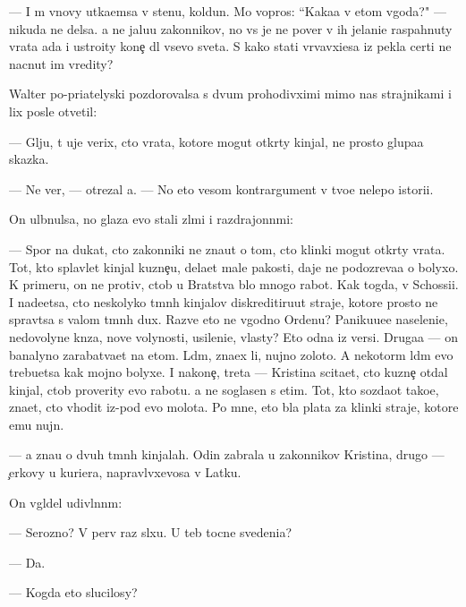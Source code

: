 \documentclass[10pt]{book}
\begin{document}
— I m{\yi} vnovy ut{\yi}ka{\y}emsa v stenu, koldun. Mo{\y} vopros: ``Kaka{\y}a v etom v{\yi}\-go\-da?" — nikuda ne delsa. {\Y}a ne jalu{\y}u zakonnikov, no vs{\e} je ne pover{\io} v ih jelani{\y}e raspahnuty vra\-ta ada i ustro{\y}ity kone{\c} dl{\ia} vsevo sveta. S kako{\y} stati v{\yi}rvavxi{\y}esa iz pekla certi ne nacnut im vredity?

Walter po-pri{\y}atelyski pozdorovalsa s dvum{\ia} prohodivximi mimo nas strajnikami i lix posle otvetil:

— Gl{\ia}ju, t{\yi} uje verix, cto vra\-ta, ko\-to\-r{\yi}\-{\y}e mogut otkr{\yi}ty kinjal{\yi}, ne prosto glupa{\y}a skazka.

— Ne ver{\io}, — otrezal {\y}a. — No eto vesom{\yi}{\y} kontrargument v tvo{\y}e{\y} nelepo{\y} istori{\y}i.

On ul{\yi}bnulsa, no glaza {\y}evo stali zl{\yi}mi i razdrajonn{\yi}mi:

— Spor{\io} na dukat, cto zakonniki ne zna{\y}ut o tom, cto klinki mogut otkr{\yi}ty vra\-ta. Tot, kto splavl{\ia}{\y}et kinjal{\yi} kuzne{\c}u, dela{\y}et mal{\yi}{\y}e pakosti, daje ne podozreva{\y}a o bolyxo{\y}. K primeru, on ne protiv, ctob{\yi} u Bratstva b{\yi}lo mnogo rabot{\yi}. Kak togda, v Schossi{\y}i. I nade{\y}etsa, cto neskolyko t{\e}mn{\yi}h kinjalov diskreditiru{\y}ut straje{\y}, ko\-to\-r{\yi}\-{\y}e prosto ne sprav{\ia}tsa s valom t{\e}mn{\yi}h dux. Razve eto ne v{\yi}godno Ordenu? Paniku{\y}u{\x}e{\y}e naseleni{\y}e, nedovolyn{\yi}{\y}e kn{\ia}z{\y}a, nov{\yi}{\y}e volynosti, usileni{\y}e, vlas\-ty? Eto odna iz versi{\y}. Druga{\y}a — on banalyno zarabat{\yi}va{\y}et na etom. L{\io}d{\ia}m, zna\-{\y}ex li, nujno zoloto. A nekotor{\yi}m l{\io}d{\ia}m {\y}evo trebu{\y}etsa kak mojno bolyxe. I na\-ko\-ne{\c}, tret{\y}a — Kristina sci\-ta\-{\y}et, cto kuzne{\c} otdal kinjal, ctob{\yi} proverity {\y}evo rabotu. {\Y}a ne soglasen s etim. Tot, kto sozda{\y}ot tako{\y}e, zna{\y}et, cto v{\yi}hodit iz-pod {\y}evo molota. Po mne, eto b{\yi}la plata za klinki straje{\y}, ko\-to\-r{\yi}\-{\y}e {\y}emu nujn{\yi}.

— {\Y}a zna{\y}u o dvuh t{\e}mn{\yi}h kinjalah. Odin zabrala u zakonnikov Kristina, drugo{\y} — {\c}erkovy u kuriera, napravl{\ia}vxevosa v Latku.

On v{\yi}gl{\ia}del udivl{\e}nn{\yi}m:

— Ser{\y}ozno? V perv{\yi}{\y} raz sl{\yi}xu. U teb{\ia} tocn{\yi}{\y}e svedeni{\y}a?

— Da.

— Kogda eto slucilosy?
\end{document}
